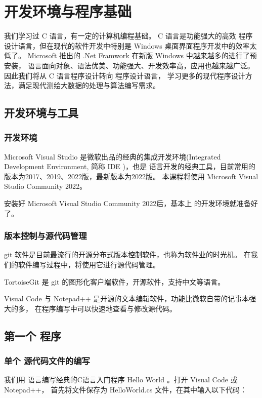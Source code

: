 
\chapter{ \cs 开发环境与程序基础}

我们学习过 C 语言，有一定的计算机编程基础。 C 语言是功能强大的高效
程序设计语言，但在现代的软件开发中特别是 Windows 桌面界面程序开发中的效率太低了。
Microsoft 推出的 .Net Framwork 在新版 Windows 中越来越多的进行了预安装，
 \cs 语言面向对象、语法优美、功能强大、开发效率高，应用也越来越广泛。
因此我们将从 C 语言程序设计转向 \cs 程序设计语言，
学习更多的现代程序设计方法，满足现代测绘大数据的处理与算法编写需求。

\section{ \cs  开发环境与工具}

\subsection{ \cs  开发环境}
Microsoft Visual Studio 是微软出品的经典的集成开发环境(Integrated Development Environment,
简称 IDE )，也是 \cs 语言开发的经典工具，目前常用的版本为2017、2019、2022版，最新版本为2022版。
本课程将使用 Microsoft Visual Studio Community 2022。

安装好 Microsoft Visual Studio Community 2022后，基本上 \cs  的开发环境就准备好了。

\subsection{版本控制与源代码管理}
git 软件是目前最流行的开源分布式版本控制软件，也称为软件业的时光机。
在我们的软件编写过程中，将使用它进行源代码管理。

TortoiseGit 是 git 的图形化客户端软件，开源软件，支持中文等语言。

Visual Code 与  Notepad++ 是开源的文本编辑软件，功能比微软自带的记事本强大的多，
在程序编写中可以快速地查看与修改源代码。


\section{第一个 \cs  程序}

\subsection{单个 \cs  源代码文件的编写}
我们用 \cs 语言编写经典的C语言入门程序 Hello World 。打开 Visual Code 或 Notepad++，
首先将文件保存为 HelloWorld.cs 文件，在其中输入以下代码：

